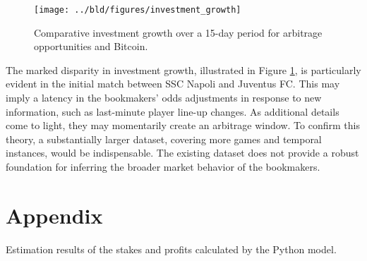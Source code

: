 \documentclass[11pt, a4paper, leqno]{article}
\begin{document}
\begin{figure}[H]
    \centering
    \texttt{[image: ../bld/figures/investment\_growth]}
    \caption{Comparative investment growth over a 15-day period for arbitrage opportunities and Bitcoin.}
    \label{fig:investment_growth_comparison}
\end{figure}

The marked disparity in investment growth, illustrated in Figure \ref{fig:investment_growth_comparison}, is particularly evident in the initial match between SSC Napoli and Juventus FC. This may imply a latency in the bookmakers' odds adjustments in response to new information, such as last-minute player line-up changes. As additional details come to light, they may momentarily create an arbitrage window. To confirm this theory, a substantially larger dataset, covering more games and temporal instances, would be indispensable. The existing dataset does not provide a robust foundation for inferring the broader market behavior of the bookmakers.

\printbibliography
{}


\clearpage
\appendix

\section*{Appendix}

\setcounter{table}{0}
\renewcommand{\thetable}{A\arabic{table}}

\begin{table}[H]
    \scalebox{0.65}{
        
    }
    \caption{Estimation results of the stakes and profits calculated by the Python model.}
    \label{tab:summary}
\end{table}
\end{document}
